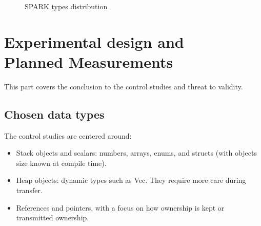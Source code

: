 \documentclass[nomenclature, english, bibtex]{kththesis}
\begin{document}
\begin{figure}[ht!]
  \centering
  \caption{SPARK types distribution}
  \label{fig:repartition_spark}
\end{figure}
\FloatBarrier



\section[Experimental design/Planned Measurements]{Experimental design and\\Planned Measurements}
\label{sec:experimentalDesign}

This part covers the conclusion to the control studies and threat to validity.
\subsection{Chosen data types}
The control studies are centered around:
\begin{itemize}
    \item Stack objects and scalars: numbers, arrays, enums, and structs (with objects size known at compile time).
    \item Heap objects: dynamic types such as Vec. They require more care during transfer.
    \item References and pointers, with a focus on how ownership is kept or transmitted ownership.
\end{itemize}
\end{document}
